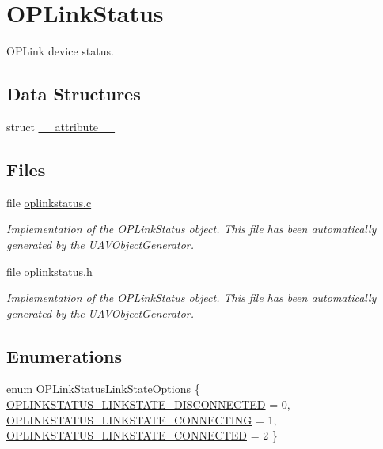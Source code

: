 \hypertarget{group___o_p_link_status}{\section{\-O\-P\-Link\-Status}
\label{group___o_p_link_status}
}


\-O\-P\-Link device status.  


\subsection*{\-Data \-Structures}
\begin{DoxyCompactItemize}
\item 
struct \hyperlink{struct____attribute____}{\-\_\-\-\_\-attribute\-\_\-\-\_\-}
\end{DoxyCompactItemize}
\subsection*{\-Files}
\begin{DoxyCompactItemize}
\item 
file \hyperlink{oplinkstatus_8c}{oplinkstatus.\-c}
\begin{DoxyCompactList}\small\item\em \-Implementation of the \-O\-P\-Link\-Status object. \-This file has been automatically generated by the \-U\-A\-V\-Object\-Generator. \end{DoxyCompactList}\item 
file \hyperlink{oplinkstatus_8h}{oplinkstatus.\-h}
\begin{DoxyCompactList}\small\item\em \-Implementation of the \-O\-P\-Link\-Status object. \-This file has been automatically generated by the \-U\-A\-V\-Object\-Generator. \end{DoxyCompactList}\end{DoxyCompactItemize}
\subsection*{\-Enumerations}
\begin{DoxyCompactItemize}
\item 
enum \hyperlink{group___o_p_link_status_ga603fbe1f667581b269d26bc7fdbe3d3f}{\-O\-P\-Link\-Status\-Link\-State\-Options} \{ \hyperlink{group___o_p_link_status_gga603fbe1f667581b269d26bc7fdbe3d3facbcbc2aa8f16136dc6cf68fea518a275}{\-O\-P\-L\-I\-N\-K\-S\-T\-A\-T\-U\-S\-\_\-\-L\-I\-N\-K\-S\-T\-A\-T\-E\-\_\-\-D\-I\-S\-C\-O\-N\-N\-E\-C\-T\-E\-D} = 0, 
\hyperlink{group___o_p_link_status_gga603fbe1f667581b269d26bc7fdbe3d3fa80b5e229116b30cffa2e84ce7275e8ae}{\-O\-P\-L\-I\-N\-K\-S\-T\-A\-T\-U\-S\-\_\-\-L\-I\-N\-K\-S\-T\-A\-T\-E\-\_\-\-C\-O\-N\-N\-E\-C\-T\-I\-N\-G} = 1, 
\hyperlink{group___o_p_link_status_gga603fbe1f667581b269d26bc7fdbe3d3fa7de41967a6e8e9aa78e1c09186e6747e}{\-O\-P\-L\-I\-N\-K\-S\-T\-A\-T\-U\-S\-\_\-\-L\-I\-N\-K\-S\-T\-A\-T\-E\-\_\-\-C\-O\-N\-N\-E\-C\-T\-E\-D} = 2
 \}
\end{DoxyCompactItemize}
